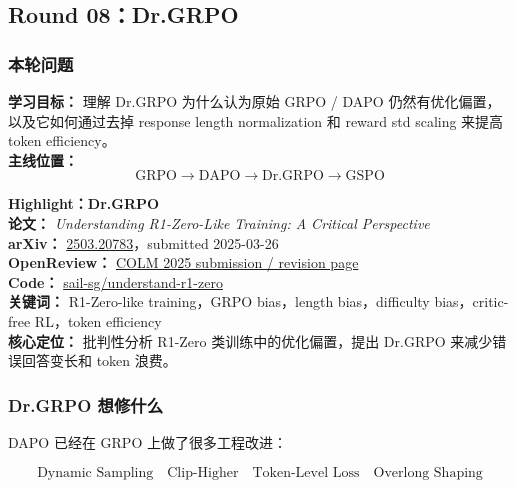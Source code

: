 
\subsection{Round 08：Dr.GRPO}

\subsubsection{本轮问题}

\begin{conceptbox}
\textbf{学习目标：} 理解 Dr.GRPO 为什么认为原始 GRPO / DAPO 仍然有优化偏置，以及它如何通过去掉 response length normalization 和 reward std scaling 来提高 token efficiency。\\
\textbf{主线位置：}
\[
\text{GRPO}
\to
\text{DAPO}
\to
\text{Dr.GRPO}
\to
\text{GSPO}
\]
\end{conceptbox}

\begin{conceptbox}
\textbf{Highlight：Dr.GRPO}\\
\textbf{论文：} \emph{Understanding R1-Zero-Like Training: A Critical Perspective}\\
\textbf{arXiv：} \href{https://arxiv.org/abs/2503.20783}{2503.20783}，submitted 2025-03-26\\
\textbf{OpenReview：} \href{https://openreview.net/forum?id=5PAF7PAY2Y}{COLM 2025 submission / revision page}\\
\textbf{Code：} \href{https://github.com/sail-sg/understand-r1-zero}{sail-sg/understand-r1-zero}\\
\textbf{关键词：} R1-Zero-like training，GRPO bias，length bias，difficulty bias，critic-free RL，token efficiency\\
\textbf{核心定位：} 批判性分析 R1-Zero 类训练中的优化偏置，提出 Dr.GRPO 来减少错误回答变长和 token 浪费。
\end{conceptbox}

\subsubsection{Dr.GRPO 想修什么}

DAPO 已经在 GRPO 上做了很多工程改进：

\[
\text{Dynamic Sampling}
\quad
\text{Clip-Higher}
\quad
\text{Token-Level Loss}
\quad
\text{Overlong Shaping}
\]

